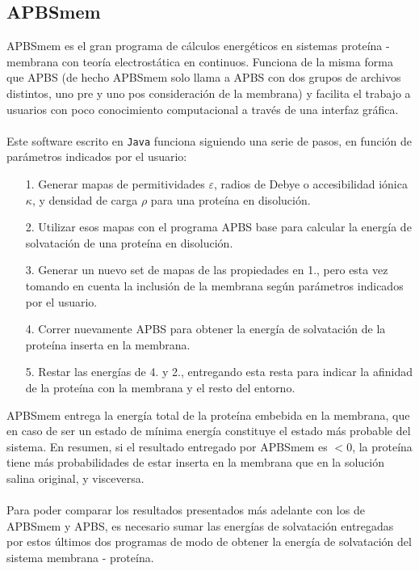 \documentclass[12pt, oneside, numbers, spanish]{ezthesis}
\numberwithin{equation}{section}
\begin{document}
\subsection{APBSmem}\label{subsec:APBSmem}
APBSmem es el gran programa de cálculos energéticos en sistemas proteína - membrana con teoría electrostática en continuos. Funciona de la misma forma que APBS (de hecho APBSmem solo llama a APBS con dos grupos de archivos distintos, uno pre y uno pos consideración de la membrana) y facilita el trabajo a usuarios con poco conocimiento computacional a través de una interfaz gráfica.\\\\
Este software escrito en \texttt{Java} funciona siguiendo una serie de pasos, en función de parámetros indicados por el usuario:
\begin{itemize}
	\item[1.] Generar mapas de permitividades $\varepsilon$, radios de Debye o accesibilidad iónica $\kappa$, y densidad de carga $\rho$ para una proteína en disolución.
	\item[2.] Utilizar esos mapas con el programa APBS base para calcular la energía de solvatación de una proteína en disolución.
	\item[3.] Generar un nuevo set de mapas de las propiedades en 1., pero esta vez tomando en cuenta la inclusión de la membrana según parámetros indicados por el usuario.
	\item[4.] Correr nuevamente APBS para obtener la energía de solvatación de la proteína inserta en la membrana.
	\item[5.] Restar las energías de 4. y 2., entregando esta resta para indicar la afinidad de la proteína con la membrana y el resto del entorno.
\end{itemize}
APBSmem entrega la energía total de la proteína embebida en la membrana, que en caso de ser un estado de mínima energía constituye el estado más probable del sistema. En resumen, si el resultado entregado por APBSmem es $<0$, la proteína tiene más probabilidades de estar inserta en la membrana que en la solución salina original, y visceversa.\\\\
Para poder comparar los resultados presentados más adelante con los de APBSmem y APBS, es necesario sumar las energías de solvatación entregadas por estos últimos dos programas de modo de obtener la energía de solvatación del sistema membrana - proteína.
\end{document}

